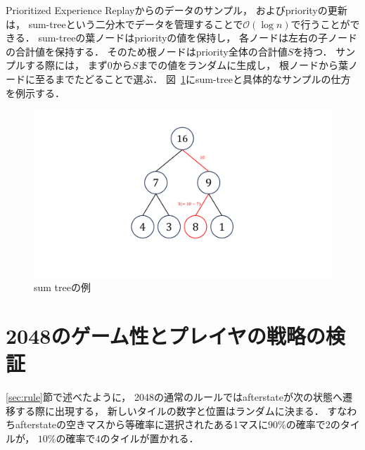Prioritized Experience Replayからのデータのサンプル， およびpriorityの更新は， sum-treeという二分木でデータを管理することで$\mathcal{O}(\log n)$で行うことができる．
sum-treeの葉ノードはpriorityの値を保持し， 各ノードは左右の子ノードの合計値を保持する．
そのため根ノードはpriority全体の合計値$S$を持つ．
サンプルする際には， まず$0$から$S$までの値をランダムに生成し， 根ノードから葉ノードに至るまでたどることで選ぶ．
図~\ref{fig:sumtree}にsum-treeと具体的なサンプルの仕方を例示する．
\begin{figure}[t]
    \centering
    \includegraphics[width=0.4\linewidth{}]{figures/sumtree_.pdf}
    \caption{sum treeの例}
    \label{fig:sumtree}
\end{figure}

\chapter{2048のゲーム性とプレイヤの戦略の検証}
\ref{sec:rule}節で述べたように， 2048の通常のルールではafterstateが次の状態へ遷移する際に出現する， 新しいタイルの数字と位置はランダムに決まる．
すなわちafterstateの空きマスから等確率に選択されたある1マスに$90\%$の確率で$2$のタイルが， $10\%$の確率で$4$のタイルが置かれる．

